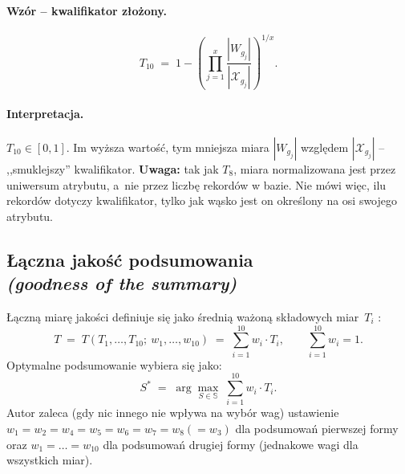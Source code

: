 \paragraph{Wzór -- kwalifikator złożony.}
\begin{equation}
\label{eq:T10-multi}
    T_{10} \;=\; 1 - \left( \prod_{j=1}^{x} \frac{|W_{g_j}|}{|\mathcal{X}_{g_j}|} \right)^{1/x}.
\end{equation}

\paragraph{Interpretacja.}
$T_{10} \in [0, 1]$. Im wyższa wartość, tym mniejsza miara
$|W_{g_j}|$ względem $|\mathcal{X}_{g_j}|$ -- ,,smuklejszy''
kwalifikator. \textbf{Uwaga:} tak jak $T_8$, miara normalizowana jest
przez uniwersum atrybutu, a~nie przez liczbę rekordów w bazie. Nie
mówi więc, ilu rekordów dotyczy kwalifikator, tylko jak wąsko jest
on określony na osi swojego atrybutu.

\subsection*{Łączna jakość podsumowania \\
\textit{(goodness of the summary)}}

Łączną miarę jakości definiuje się jako średnią ważoną składowych
miar~$T_i$ \cite[wzór~(8.74)]{niewiadomski2008}:
\begin{equation}
\label{eq:goodness}
    T \;=\; T(T_1, \ldots, T_{10};\ w_1, \ldots, w_{10})
    \;=\; \sum_{i=1}^{10} w_i \cdot T_i,
    \qquad
    \sum_{i=1}^{10} w_i = 1.
\end{equation}
Optymalne podsumowanie wybiera się jako:
\begin{equation}
\label{eq:goodness-argmax}
    S^{*} \;=\; \arg\max_{S \in \mathbb{S}}\; \sum_{i=1}^{10} w_i \cdot T_i.
\end{equation}
Autor zaleca (gdy nic innego nie wpływa na wybór wag) ustawienie
$w_1 = w_2 = w_4 = w_5 = w_6 = w_7 = w_8 (= w_3)$ dla podsumowań
pierwszej formy oraz $w_1 = \ldots = w_{10}$ dla podsumowań drugiej
formy (jednakowe wagi dla wszystkich miar).

